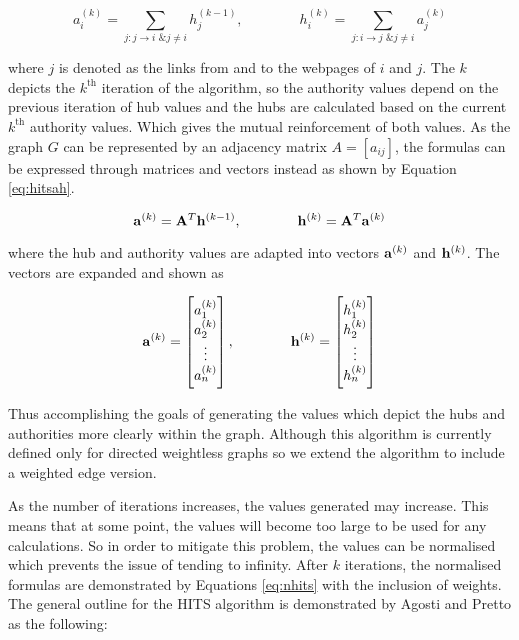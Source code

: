 \begin{equation}
a_i^{(k)} = \sum_{j:j\rightarrow i \text{ \& } j \ne i}h_j^{(k-1)} , \qquad \qquad h_i^{(k)} = \sum_{j:i \rightarrow j \text{ \& } j \ne i}a_j^{(k)}
\end{equation}

where $j$ is denoted as the links from and to the webpages of $i$ and $j$. The $k$ depicts the $k^{\text{th}}$ iteration of the algorithm, so the authority values depend on the previous iteration of hub values and the hubs are calculated based on the current $k^{\text{th}}$ authority values. Which gives the mutual reinforcement of both values. As the graph $G$ can be represented by an adjacency matrix $A = [a_{ij}]$, the formulas can be expressed through matrices \cite{chatzigeorgiou2006application} and vectors instead as shown by Equation \ref{eq:hitsah}.

\begin{equation}\label{eq:hitsah}
\bold{a}^{(k)} = \bold{A}^{T}\bold{h}^{(k-1)} , \qquad \qquad \bold{h}^{(k)} = \bold{A}^{T}\bold{a}^{(k)}
\end{equation}

where the hub and authority values are adapted into vectors $\bold{a}^{(k)}$ and $\bold{h}^{(k)}$. The vectors are expanded and shown as

\begin{equation}
\bold{a}^{(k)} = \begin{bmatrix}
           a_1^{(k)} \\
           a_2^{(k)} \\
           \vdots \\
           a_n^{(k)}
         	\end{bmatrix}
           , \qquad \qquad 
\bold{h}^{(k)} = \begin{bmatrix}
           h_{1}^{(k)} \\
           h_{2}^{(k)} \\
           \vdots \\
           h_{n}^{(k)}
         	\end{bmatrix}
\end{equation}

Thus accomplishing the goals of generating the values which depict the hubs and authorities more clearly within the graph. Although this algorithm is currently defined only for directed weightless graphs so we extend the algorithm to include a weighted edge version.

As the number of iterations increases, the values generated may increase. This means that at some point, the values will become too large to be used for any calculations. So in order to mitigate this problem, the values can be normalised which prevents the issue of tending to infinity. After $k$ iterations, the normalised formulas are demonstrated by Equations \ref{eq:nhits} with the inclusion of weights. The general outline for the HITS algorithm is demonstrated by Agosti and Pretto \cite{agosti2005theoretical} as the following:
\newline

